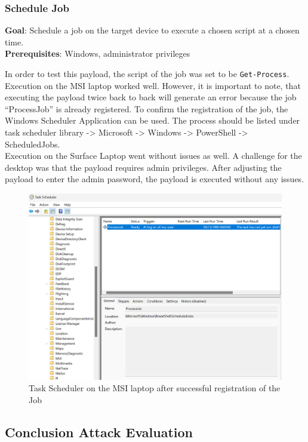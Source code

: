 \subsubsection{Schedule Job}

\textbf{Goal}: Schedule a job on the target device to execute a chosen script at a chosen time. \\
\textbf{Prerequisites}: Windows, administrator privileges

In order to test this payload, the script of the job was set to be \verb|Get-Process|. Execution on the MSI laptop worked well. However, it is important to note, that executing the payload twice back to back will generate an error because the job ``ProcessJob'' is already registered. To confirm the registration of the job, the Windows Scheduler Application can be used. The process should be listed under task scheduler library -> Microsoft -> Windows -> PowerShell -> ScheduledJobs. \\
Execution on the Surface Laptop went without issues as well. A challenge for the desktop was that the payload requires admin privileges. After adjusting the payload to enter the admin password, the payload is executed without any issues. 

\begin{figure}[H]
    \centering
    \includegraphics[width=0.5\linewidth]{visuals/task_scheduler_MSI.jpeg}
    \caption{Task Scheduler on the MSI laptop after successful registration of the Job}
    \label{fig:TaskScheduler}
\end{figure}



\subsection{Conclusion Attack Evaluation}

